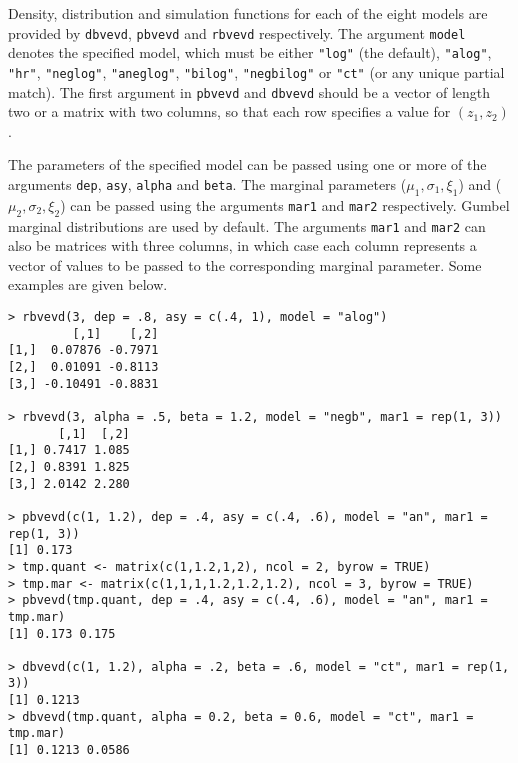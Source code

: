 \documentclass[11pt,a4paper]{article}
\begin{document}
Density, distribution and simulation functions for each of the eight models are provided by \verb+dbvevd+, \verb+pbvevd+ and \verb+rbvevd+ respectively.
The argument \verb+model+ denotes the specified model, which must be either \verb+"log"+ (the default), \verb+"alog"+, \verb+"hr"+, \verb+"neglog"+, \verb+"aneglog"+, \verb+"bilog"+, \verb+"negbilog"+ or \verb+"ct"+ (or any unique partial match).
The first argument in \verb+pbvevd+ and \verb+dbvevd+ should be a vector of length two or a matrix with two columns, so that each row specifies a value for $(z_1,z_2)$.

The parameters of the specified model can be passed using one or more of the arguments \verb+dep+, \verb+asy+, \verb+alpha+ and \verb+beta+.
The marginal parameters ($\mu_1,\sigma_1,\xi_1$) and ($\mu_2,\sigma_2,\xi_2$) can be passed using the arguments \verb+mar1+ and \verb+mar2+ respectively.
Gumbel marginal distributions are used by default.
The arguments \verb+mar1+ and \verb+mar2+ can also be matrices with three columns, in which case each column represents a vector of values to be passed to the corresponding marginal parameter.
Some examples are given below.

\begin{verbatim}
> rbvevd(3, dep = .8, asy = c(.4, 1), model = "alog")
         [,1]    [,2]
[1,]  0.07876 -0.7971
[2,]  0.01091 -0.8113
[3,] -0.10491 -0.8831

> rbvevd(3, alpha = .5, beta = 1.2, model = "negb", mar1 = rep(1, 3))
       [,1]  [,2]
[1,] 0.7417 1.085
[2,] 0.8391 1.825
[3,] 2.0142 2.280

> pbvevd(c(1, 1.2), dep = .4, asy = c(.4, .6), model = "an", mar1 = rep(1, 3))
[1] 0.173
> tmp.quant <- matrix(c(1,1.2,1,2), ncol = 2, byrow = TRUE)
> tmp.mar <- matrix(c(1,1,1,1.2,1.2,1.2), ncol = 3, byrow = TRUE)
> pbvevd(tmp.quant, dep = .4, asy = c(.4, .6), model = "an", mar1 = tmp.mar)
[1] 0.173 0.175

> dbvevd(c(1, 1.2), alpha = .2, beta = .6, model = "ct", mar1 = rep(1, 3))
[1] 0.1213
> dbvevd(tmp.quant, alpha = 0.2, beta = 0.6, model = "ct", mar1 = tmp.mar)
[1] 0.1213 0.0586
\end{verbatim}

\end{document}
